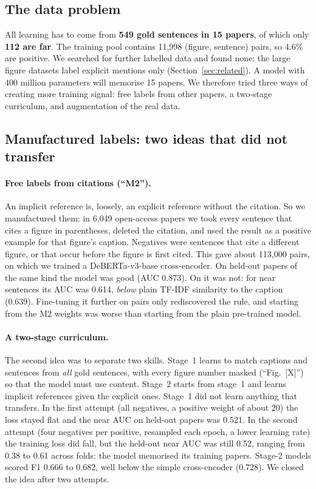 \subsection{The data problem}
All learning has to come from \textbf{549 gold sentences in 15 papers}, of which only \textbf{112 are far}.
The training pool contains 11{,}998 (figure, sentence) pairs, so 4.6\% are positive. We searched for further
labelled data and found none: the large figure datasets label explicit mentions only
(Section~\ref{sec:related}). A model with 400 million parameters will memorise 15 papers. We therefore tried
three ways of creating more training signal: free labels from other papers, a two-stage curriculum, and
augmentation of the real data.

\subsection{Manufactured labels: two ideas that did not transfer}
\label{sec:fakelabels}

\paragraph{Free labels from citations (``M2'').} An implicit reference is, loosely, an explicit reference
without the citation. So we manufactured them: in 6{,}049 open-access papers we took every sentence that cites
a figure in parentheses, deleted the citation, and used the result as a positive example for that figure's
caption. Negatives were sentences that cite a different figure, or that occur before the figure is first
cited. This gave about 113{,}000 pairs, on which we trained a DeBERTa-v3-base cross-encoder. On held-out
papers of the same kind the model was good (AUC 0.873). On \figsum{} it was not: for near sentences its AUC
was 0.614, \emph{below} plain TF-IDF similarity to the caption (0.639). Fine-tuning it further on \figsum{}
pairs only rediscovered the  rule, and starting from the M2 weights was worse than starting from the
plain pre-trained model.

\paragraph{A two-stage curriculum.} The second idea was to separate two skills. Stage~1 learns to match
captions and sentences from \emph{all} gold sentences, with every figure number masked (``Fig.~[X]'') so that
the model must use content. Stage~2 starts from stage~1 and learns implicit references given the explicit
ones. Stage~1 did not learn anything that transfers. In the first attempt (all negatives, a positive weight of
about 20) the loss stayed flat and the near AUC on held-out papers was 0.521. In the second attempt (four
negatives per positive, resampled each epoch, a lower learning rate) the training loss did fall, but the
held-out near AUC was still 0.52, ranging from 0.38 to 0.61 across folds: the model memorised its training
papers. Stage-2 models scored F1 0.666 to 0.682, well below the simple cross-encoder (0.728). We closed the
idea after two attempts.

